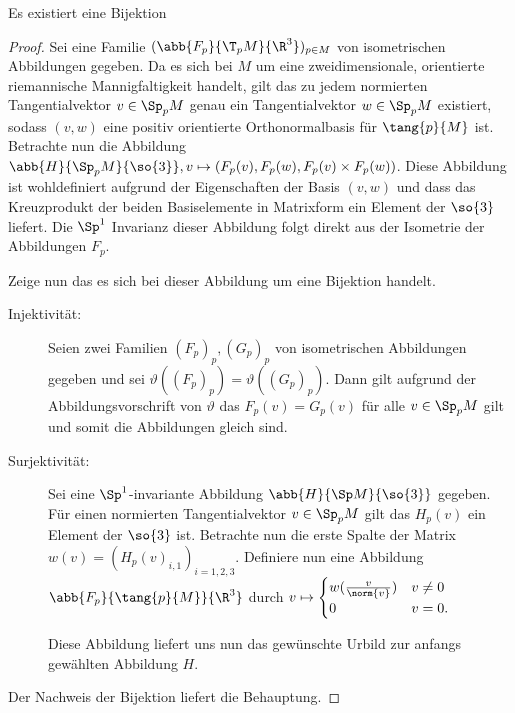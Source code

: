 \begin{Satz}
	Es existiert eine Bijektion
\begin{center}
\end{center}
\begin{proof}
	Sei eine Familie $(\abb{F_p}{\T_pM}{\R^3})_{p\in M}$ von 
	isometrischen Abbildungen gegeben.
	Da es sich bei $M$ um eine zweidimensionale, orientierte riemannische Mannigfaltigkeit handelt, gilt das zu jedem normierten Tangentialvektor $v \in \Sp_p M$ genau ein Tangentialvektor $w \in \Sp_p M$
	existiert, sodass $(v,w)$ eine positiv orientierte Orthonormalbasis für	$\tang{p}{M}$ ist. Betrachte nun die Abbildung $\abb{H}{\Sp_p%
		M}{\so{3}}, v \mapsto (F_p(v),F_p(w),F_p(v)\times F_p(w))$. 
	Diese Abbildung ist wohldefiniert aufgrund der Eigenschaften
	der Basis $(v,w)$ und dass das Kreuzprodukt der beiden
	Basiselemente in Matrixform ein Element der $\so{3}$ liefert.
	Die $\Sp^1$ Invarianz dieser Abbildung folgt direkt
	aus der Isometrie der Abbildungen $F_p$.
	
	Zeige nun das es sich bei dieser Abbildung um eine Bijektion handelt. 
	\begin{description}
		\item[Injektivität:] Seien zwei Familien $(F_p)_p,(G_p)_p$ von
		isometrischen Abbildungen gegeben und sei $\vartheta((F_p)_p)=\vartheta((G_p)_p)$. Dann gilt aufgrund
		der Abbildungsvorschrift von $\vartheta$ das $F_p(v)=G_p(v)$
		für alle $v \in \Sp_p M$ gilt und somit die Abbildungen gleich
		sind.
		\item[Surjektivität:] Sei eine $\Sp^1$-invariante Abbildung
		$\abb{H}{\Sp M}{\so{3}}$ gegeben. Für einen normierten
		Tangentialvektor $v \in \Sp_p M$ gilt das $H_p(v)$ ein
		Element der $\so{3}$ ist. Betrachte nun die erste Spalte
		der Matrix $w(v)=(H_p(v)_{i,1})_{i=1,2,3}$. Definiere nun eine
		Abbildung $\abb{F_p}{\tang{p}{M}}{\R^3}$ durch 
		$v \mapsto \begin{cases}%
		w(\frac{v}{\norm{v}}) & v \neq 0 \\
		0 & v=0.
		\end{cases}$
		
		Diese Abbildung liefert uns nun das gewünschte Urbild zur
		anfangs gewählten Abbildung $H$. 
	\end{description}
	Der Nachweis der Bijektion liefert die Behauptung.
\end{proof}

\end{Satz}

